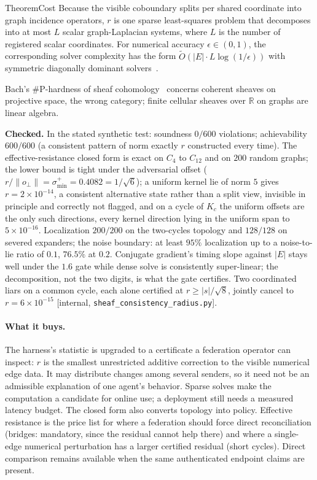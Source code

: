 \documentclass[11pt,a4paper]{article}
\theoremstyle{definition}
\theoremstyle{remark}
\begin{document}
\begin{pdclaim}{Theorem}{Cost}
\setlength{\parskip}{4pt plus 1pt}
\label{thm:radius-cost}
Because the visible coboundary splits per shared coordinate into graph
incidence operators, $r$ is one sparse least-squares problem that decomposes
into at most $L$ scalar graph-Laplacian systems, where $L$ is the number
of registered scalar coordinates. For numerical accuracy $\epsilon\in(0,1)$,
the corresponding solver complexity has the form
$\widetilde O(|E|\cdot L\log(1/\epsilon))$ with symmetric diagonally dominant
solvers~. 

Bach's \#P-hardness of sheaf
cohomology~ concerns coherent sheaves on projective space, the wrong
category; finite cellular sheaves over $\mathbb{R}$ on graphs are linear
algebra.
\end{pdclaim}

\noindent\textbf{Checked.} In the stated synthetic test: soundness $0/600$ violations; achievability
$600/600$ (a consistent pattern of norm exactly $r$ constructed every time).
The effective-resistance closed form is exact on $C_4$ to $C_{12}$ and on $200$
random graphs; the lower bound is tight under the adversarial offset
($r/\|o_\perp\|=\sigma^{+}_{\min}=0.4082=1/\sqrt6$); a uniform kernel lie of
norm $5$ gives $r=2\times10^{-14}$, a consistent alternative state rather than a
split view, invisible in principle and correctly not flagged, and on a cycle of
$K_c$ the uniform offsets are the only such directions, every kernel direction
lying in the uniform span to $5\times10^{-16}$. Localization $200/200$ on the
two-cycles topology and $128/128$ on severed expanders; the noise boundary:
at least $95\%$ localization up to a noise-to-lie ratio of $0.1$, $76.5\%$ at
$0.2$. Conjugate gradient's timing slope against $|E|$ stays well under the
$1.6$ gate while dense solve is consistently super-linear; the decomposition,
not the two digits, is what the gate certifies. Two coordinated liars on a
common cycle, each alone certified at $r\ge|s|/\sqrt8$, jointly cancel to
$r=6\times10^{-15}$ [internal, \texttt{sheaf\_consistency\_radius.py}].

\paragraph{What it buys.} The harness's statistic is upgraded to a certificate
a federation operator can inspect: $r$ is the smallest unrestricted
additive correction to the visible numerical edge data. It may distribute
changes among several senders, so it need not be an admissible explanation
of one agent's behavior. Sparse solves make the computation a candidate for
online use; a deployment still needs a measured latency budget. The closed form also converts topology into policy.
Effective resistance is the price list for where a federation should force
direct reconciliation (bridges: mandatory, since the residual cannot help
there) and where a single-edge numerical perturbation has a larger certified
residual (short cycles). Direct comparison remains available when the same
authenticated endpoint claims are present.
\end{document}
